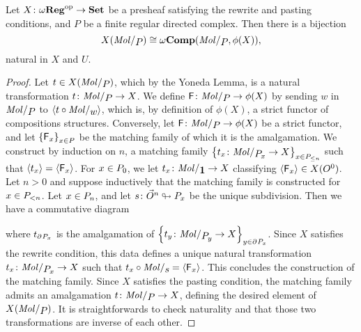 \begin{lem} \label{lem:stricter_hom_set_iso_presheaf}
    Let \( X \colon \opp{\omegaReg} \to \Set \) be a presheaf satisfying the rewrite and pasting conditions, and \( P \) be a finite regular directed complex.
    Then there is a bijection
    \begin{equation*}
        X(\molecin{P}) \cong \Comp(\molecin{P}, \phi(X)),
    \end{equation*}
    natural in \( X \) and \( U \).
\end{lem}
\begin{proof}
    Let \( t \in X(\molecin{P}) \), which by the Yoneda Lemma, is a natural transformation \( t \colon \molecin{P} \to X \).
    We define \( \F \colon \molecin{P} \to \phi(X) \) by sending \( w \) in \( \molecin{P} \) to \( \pcell{t \after \molecin{w}} \), which is, by definition of \( \phi(X) \), a strict functor of compositions structures.
    Conversely, let \( \F \colon \molecin{P} \to \phi(X) \) be a strict functor, and let \( \set{\F_x}_{x \in P} \) be the matching family of which it is the amalgamation.
    We construct by induction on \( n \), a matching family \( \set{t_x \colon \molecin{\imel{P}{x}} \to X}_{x \in \gr{\le n}{P}} \) such that \( \pcell{t_x} = \pcell{\F_x} \).    
    For \( x \in \gr{0}{P} \), we let \( t_x \colon \molecin{\pt} \to X \) classifying \( \pcell{\F_x} \in X(\globe{0}) \).
    Let \( n > 0 \) and suppose inductively that the matching family is constructed for \( x \in \gr{< n}{P} \).
    Let \( x \in \gr{n}{P} \), and let \( s \colon \dglobe{n} \sd \imel{P}{x} \) be the unique subdivision.
    Then we have a commutative diagram
    \begin{center}
    \end{center}
    where \( t_{\bd{}{} \imel{P}{x}} \) is the amalgamation of \( \set{t_y \colon \molecin{\imel{P}{y}} \to X}_{y \in \bd{}{} \imel{P}{x}} \).
    Since \( X \) satisfies the rewrite condition, this data defines a unique natural transformation \( t_x \colon \molecin{\imel{P}{x}} \to X \) such that \( t_x \after \molecin{s} = \pcell{\F_x} \).
    This concludes the construction of the matching family.
    Since \( X \) satisfies the pasting condition, the matching family admits an amalgamation \( t \colon \molecin{P} \to X \), defining the desired element of \( X(\molecin{P}) \).
    It is straightforwards to check naturality and that those two transformations are inverse of each other.
\end{proof}

